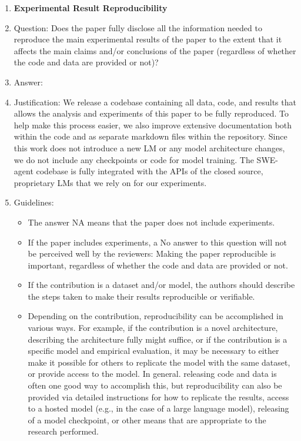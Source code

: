 \begin{enumerate}
    \item {\bf Experimental Result Reproducibility}
    \item[] Question: Does the paper fully disclose all the information needed to reproduce the main experimental results of the paper to the extent that it affects the main claims and/or conclusions of the paper (regardless of whether the code and data are provided or not)?
    \item[] Answer: \answerYes{}
    \item[] Justification: We release a codebase containing all data, code, and results that allows the analysis and experiments of this paper to be fully reproduced. To help make this process easier, we also improve extensive documentation both within the code and as separate markdown files within the repository. Since this work does not introduce a new LM or any model architecture changes, we do not include any checkpoints or code for model training. The SWE-agent codebase is fully integrated with the APIs of the closed source, proprietary LMs that we rely on for our experiments.
    \item[] Guidelines:
    \begin{itemize}
        \item The answer NA means that the paper does not include experiments.
        \item If the paper includes experiments, a No answer to this question will not be perceived well by the reviewers: Making the paper reproducible is important, regardless of whether the code and data are provided or not.
        \item If the contribution is a dataset and/or model, the authors should describe the steps taken to make their results reproducible or verifiable. 
        \item Depending on the contribution, reproducibility can be accomplished in various ways. For example, if the contribution is a novel architecture, describing the architecture fully might suffice, or if the contribution is a specific model and empirical evaluation, it may be necessary to either make it possible for others to replicate the model with the same dataset, or provide access to the model. In general. releasing code and data is often one good way to accomplish this, but reproducibility can also be provided via detailed instructions for how to replicate the results, access to a hosted model (e.g., in the case of a large language model), releasing of a model checkpoint, or other means that are appropriate to the research performed.

\end{itemize}
\end{enumerate}

